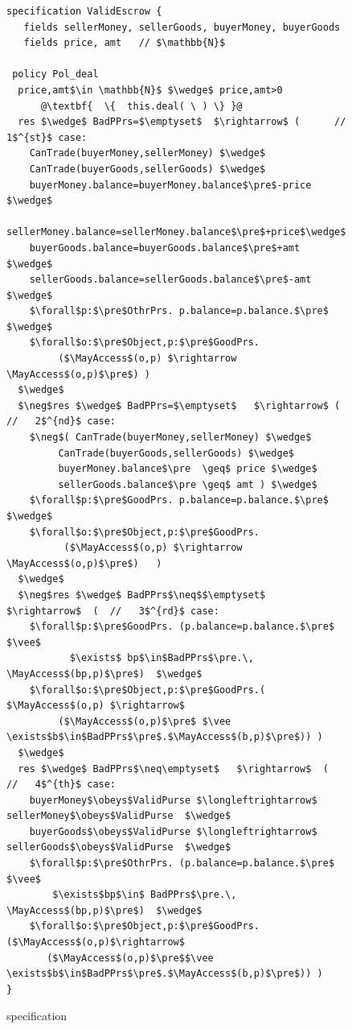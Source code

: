 \begin{figure}[hbt]
\begin{lstlisting}[escapechar=@]
specification ValidEscrow {
   fields sellerMoney, sellerGoods, buyerMoney, buyerGoods
   fields price, amt   // $\mathbb{N}$

 policy Pol_deal
  price,amt$\in \mathbb{N}$ $\wedge$ price,amt>0
      @\textbf{  \{  this.deal( \ ) \} }@
  res $\wedge$ BadPPrs=$\emptyset$  $\rightarrow$ (      //   1$^{st}$ case:
    CanTrade(buyerMoney,sellerMoney) $\wedge$
    CanTrade(buyerGoods,sellerGoods) $\wedge$
    buyerMoney.balance=buyerMoney.balance$\pre$-price $\wedge$
    sellerMoney.balance=sellerMoney.balance$\pre$+price$\wedge$
    buyerGoods.balance=buyerGoods.balance$\pre$+amt $\wedge$
    sellerGoods.balance=sellerGoods.balance$\pre$-amt $\wedge$
    $\forall$p:$\pre$OthrPrs. p.balance=p.balance.$\pre$  $\wedge$
    $\forall$o:$\pre$Object,p:$\pre$GoodPrs.
         ($\MayAccess$(o,p) $\rightarrow \MayAccess$(o,p)$\pre$) )
  $\wedge$
  $\neg$res $\wedge$ BadPPrs=$\emptyset$   $\rightarrow$ (   //   2$^{nd}$ case:
    $\neg$( CanTrade(buyerMoney,sellerMoney) $\wedge$
         CanTrade(buyerGoods,sellerGoods) $\wedge$
         buyerMoney.balance$\pre  \geq$ price $\wedge$
         sellerGoods.balance$\pre \geq$ amt ) $\wedge$
    $\forall$p:$\pre$GoodPrs. p.balance=p.balance.$\pre$   $\wedge$
    $\forall$o:$\pre$Object,p:$\pre$GoodPrs.
          ($\MayAccess$(o,p) $\rightarrow \MayAccess$(o,p)$\pre$)   )
  $\wedge$
  $\neg$res $\wedge$ BadPPrs$\neq$$\emptyset$  $\rightarrow$  (  //   3$^{rd}$ case:
    $\forall$p:$\pre$GoodPrs. (p.balance=p.balance.$\pre$ $\vee$
           $\exists$ bp$\in$BadPPrs$\pre.\, \MayAccess$(bp,p)$\pre$)  $\wedge$
    $\forall$o:$\pre$Object,p:$\pre$GoodPrs.( $\MayAccess$(o,p) $\rightarrow$
         ($\MayAccess$(o,p)$\pre$ $\vee \exists$b$\in$BadPPrs$\pre$.$\MayAccess$(b,p)$\pre$)) )
  $\wedge$
  res $\wedge$ BadPPrs$\neq\emptyset$   $\rightarrow$  (    //   4$^{th}$ case:
    buyerMoney$\obeys$ValidPurse $\longleftrightarrow$ sellerMoney$\obeys$ValidPurse  $\wedge$
    buyerGoods$\obeys$ValidPurse $\longleftrightarrow$ sellerGoods$\obeys$ValidPurse  $\wedge$
    $\forall$p:$\pre$OthrPrs. (p.balance=p.balance.$\pre$ $\vee$
        $\exists$bp$\in$ BadPPrs$\pre.\, \MayAccess$(bp,p)$\pre$)  $\wedge$
    $\forall$o:$\pre$Object,p:$\pre$GoodPrs. ($\MayAccess$(o,p)$\rightarrow$
       ($\MayAccess$(o,p)$\pre$$\vee \exists$b$\in$BadPPrs$\pre$.$\MayAccess$(b,p)$\pre$)) )
}
\end{lstlisting}
\vspace*{-7mm}
\caption{ specification}
\label{fig:ValidEscrow}
\end{figure}


